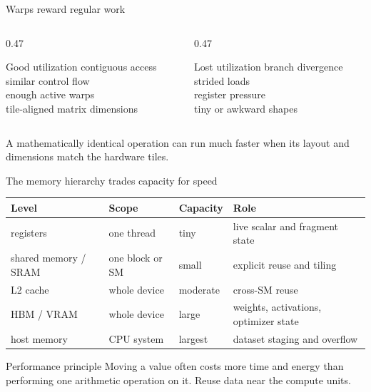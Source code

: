 \documentclass[handout]{beamer}
\begin{document}
\begin{frame}{Warps reward regular work}
  \begin{columns}[t]
    \begin{column}{0.47\linewidth}
      \begin{block}{Good utilization}
        contiguous access\\similar control flow\\enough active warps\\tile-aligned matrix dimensions
      \end{block}
    \end{column}
    \begin{column}{0.47\linewidth}
      \begin{alertblock}{Lost utilization}
        branch divergence\\strided loads\\register pressure\\tiny or awkward shapes
      \end{alertblock}
    \end{column}
  \end{columns}
  \vfill
  \centering A mathematically identical operation can run much faster when its layout and dimensions match the hardware tiles.
\end{frame}

\begin{frame}{The memory hierarchy trades capacity for speed}
  \centering\small
  \begin{tabular}{@{}>{\raggedright\arraybackslash}p{.22\linewidth}>{\raggedright\arraybackslash}p{.16\linewidth}>{\raggedright\arraybackslash}p{.13\linewidth}>{\raggedright\arraybackslash}p{.36\linewidth}@{}}
    \toprule
    Level & Scope & Capacity & Role \\
    \midrule
    registers & one thread & tiny & live scalar and fragment state \\
    shared memory / SRAM & one block or SM & small & explicit reuse and tiling \\
    L2 cache & whole device & moderate & cross-SM reuse \\
    HBM / VRAM & whole device & large & weights, activations, optimizer state \\
    host memory & CPU system & largest & dataset staging and overflow \\
    \bottomrule
  \end{tabular}
  \vfill
  \begin{alertblock}{Performance principle}
    Moving a value often costs more time and energy than performing one arithmetic operation on it. Reuse data near the compute units.
  \end{alertblock}
\end{frame}
\end{document}
